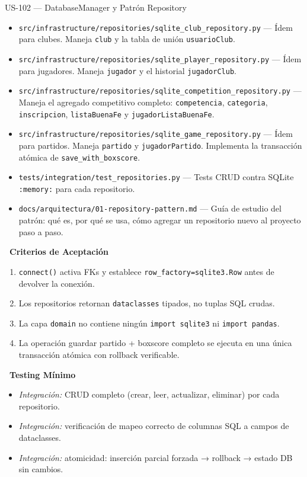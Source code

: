 \documentclass[11pt,a4paper]{article}
\newcommand{\fpath}[1]{\texttt{\small #1}}
\newcommand{\usfield}[2][\;]{%
  \par\vspace{5pt}%
  {\small\textbf{\textcolor{primary}{#2}}}\par\vspace{2pt}%
}
\begin{document}
\begin{uscard}{US-102 — DatabaseManager y Patrón Repository}
\begin{itemize}[nosep, leftmargin=1.6em]
  \item \fpath{src/infrastructure/repositories/sqlite\_club\_repository.py} — Ídem para clubes. Maneja \fpath{club} y la tabla de unión \fpath{usuarioClub}.
  \item \fpath{src/infrastructure/repositories/sqlite\_player\_repository.py} — Ídem para jugadores. Maneja \fpath{jugador} y el historial \fpath{jugadorClub}.
  \item \fpath{src/infrastructure/repositories/sqlite\_competition\_repository.py} — Maneja el agregado competitivo completo: \fpath{competencia}, \fpath{categoria}, \fpath{inscripcion}, \fpath{listaBuenaFe} y \fpath{jugadorListaBuenaFe}.
  \item \fpath{src/infrastructure/repositories/sqlite\_game\_repository.py} — Ídem para partidos. Maneja \fpath{partido} y \fpath{jugadorPartido}. Implementa la transacción atómica de \fpath{save\_with\_boxscore}.
  \item \fpath{tests/integration/test\_repositories.py} — Tests CRUD contra SQLite \fpath{:memory:} para cada repositorio.
  \item \fpath{docs/arquitectura/01-repository-pattern.md} — Guía de estudio del patrón: qué es, por qué se usa, cómo agregar un repositorio nuevo al proyecto paso a paso.
\end{itemize}

\usfield{\faCheckCircle\ Criterios de Aceptación}
\begin{enumerate}[label=\textcolor{accent}{\textbf{AC\arabic*.}}, nosep, leftmargin=2.2em]
  \item \fpath{connect()} activa FKs y establece \fpath{row\_factory=sqlite3.Row} antes de devolver la conexión.
  \item Los repositorios retornan \fpath{dataclasses} tipados, no tuplas SQL crudas.
  \item La capa \fpath{domain} no contiene ningún \fpath{import sqlite3} ni \fpath{import pandas}.
  \item La operación guardar partido + boxscore completo se ejecuta en una única transacción atómica con rollback verificable.
\end{enumerate}

\usfield{\faFlask\ Testing Mínimo}
\begin{itemize}[nosep, leftmargin=1.6em]
  \item \textit{Integración:} CRUD completo (crear, leer, actualizar, eliminar) por cada repositorio.
  \item \textit{Integración:} verificación de mapeo correcto de columnas SQL a campos de dataclasses.
  \item \textit{Integración:} atomicidad: inserción parcial forzada → rollback → estado DB sin cambios.
\end{itemize}

\end{uscard}
\end{document}
